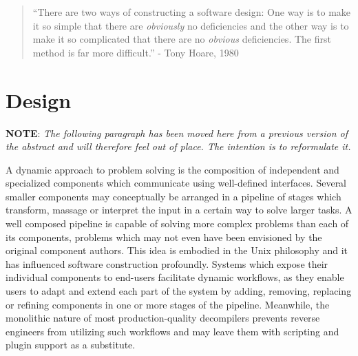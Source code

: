 
\begin{quote}
	``There are two ways of constructing a software design: One way is to make it so simple that there are \textit{obviously} no deficiencies and the other way is to make it so complicated that there are no \textit{obvious} deficiencies. The first method is far more difficult.'' - Tony Hoare, 1980 \cite{hoare_acm_lecture}
\end{quote}

\section{Design}
\label{sec:design}



\textbf{NOTE}: \textit{The following paragraph has been moved here from a previous version of the abstract and will therefore feel out of place. The intention is to reformulate it.}


A dynamic approach to problem solving is the composition of independent and specialized components which communicate using well-defined interfaces. Several smaller components may conceptually be arranged in a pipeline of stages which transform, massage or interpret the input in a certain way to solve larger tasks. A well composed pipeline is capable of solving more complex problems than each of its components, problems which may not even have been envisioned by the original component authors. This idea is embodied in the Unix philosophy and it has influenced software construction profoundly. Systems which expose their individual components to end-users facilitate dynamic workflows, as they enable users to adapt and extend each part of the system by adding, removing, replacing or refining components in one or more stages of the pipeline. Meanwhile, the monolithic nature of most production-quality decompilers prevents reverse engineers from utilizing such workflows and may leave them with scripting and plugin support as a substitute.

%

